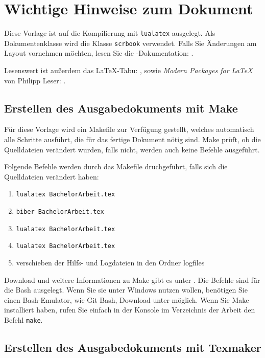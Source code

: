 \chapter{Wichtige Hinweise zum Dokument}\label{make}

Diese Vorlage ist auf die Kompilierung mit \texttt{lualatex} ausgelegt. 
Als Dokumentenklasse  wird die \KOMAScript\-Klasse \texttt{scrbook} verwendet.
Falls Sie Änderungen am Layout vornehmen möchten, lesen Sie die \KOMAScript-Dokumentation: \cite{koma}.

Lesenswert ist außerdem das \LaTeX-Tabu: \cite{l2tabu}, sowie \emph{Modern Packages for \LaTeX} von Philipp Leser: \cite{pleser}.

\section{Erstellen des Ausgabedokuments mit Make}

Für diese Vorlage wird ein Makefile zur Verfügung gestellt, welches automatisch alle Schritte ausführt, die für das fertige Dokument nötig sind. Make prüft, ob die Quelldateien verändert wurden, falls nicht, werden auch keine Befehle ausgeführt.

Folgende Befehle werden durch das Makefile druchgeführt, falls sich die Quelldateien verändert haben:

\begin{enumerate}
    \item \texttt{lualatex BachelorArbeit.tex}
    \item \texttt{biber BachelorArbeit.tex}
    \item \texttt{lualatex BachelorArbeit.tex}
    \item \texttt{lualatex BachelorArbeit.tex}
    \item verschieben der Hilfs- und Logdateien in den Ordner logfiles
\end{enumerate}


Download und weitere Informationen zu Make gibt es unter \cite{make}. Die Befehle sind für die Bash ausgelegt.
Wenn Sie sie unter Windows nutzen wollen, benötigen Sie einen Bash-Emulator, wie Git Bash, Download unter \cite{gitbash} möglich.
Wenn Sie Make installiert haben, rufen Sie einfach in der Konsole im Verzeichnis der Arbeit den Befehl \texttt{make}.


\section{Erstellen des Ausgabedokuments mit Texmaker}

